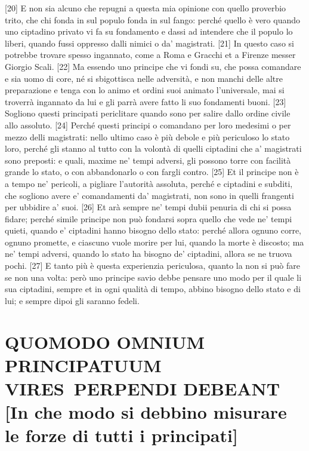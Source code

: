 {[}20{]}
E non sia alcuno che repugni a questa mia opinione con quello proverbio
trito, che chi fonda in sul populo fonda in sul fango: perché quello è
vero quando uno ciptadino privato vi fa su fondamento e dassi ad
intendere che il populo lo liberi, quando fussi oppresso dalli nimici o
da' magistrati. {[}21{]} In questo caso si potrebbe trovare spesso
ingannato, come a Roma e Gracchi et a Firenze messer Giorgio Scali.
{[}22{]} Ma essendo uno principe che vi fondi su, che possa comandare e
sia uomo di core, né si sbigottisca nelle adversità, e non manchi delle
altre preparazione e tenga con lo animo et ordini suoi animato
l'universale, mai si troverrà ingannato da lui e gli parrà avere fatto
li suo fondamenti buoni. {[}23{]} Sogliono questi principati periclitare
quando sono per salire dallo ordine civile allo assoluto. {[}24{]}
Perché questi principi o comandano per loro medesimi o per mezzo delli
magistrati: nello ultimo caso è più debole e più periculoso lo stato
loro, perché gli stanno al tutto con la volontà di quelli ciptadini che
a' magistrati sono preposti: e quali, maxime ne' tempi adversi, gli
possono torre con facilità grande lo stato, o con abbandonarlo o con
fargli contro. {[}25{]} Et il principe non è a tempo ne' pericoli, a
pigliare l'autorità assoluta, perché e ciptadini e subditi, che sogliono
avere e' comandamenti da' magistrati, non sono in quelli frangenti per
ubbidire a' suoi. {[}26{]} Et arà sempre ne' tempi dubii penuria di chi
si possa fidare; perché simile principe non può fondarsi sopra quello
che vede ne' tempi quieti, quando e' ciptadini hanno bisogno dello
stato: perché allora ognuno corre, ognuno promette, e ciascuno vuole
morire per lui, quando la morte è discosto; ma ne' tempi adversi, quando
lo stato ha bisogno de' ciptadini, allora se ne truova pochi. {[}27{]} E
tanto più è questa experienzia periculosa, quanto la non si può fare se
non una volta: però uno principe savio debbe pensare uno modo per il
quale li sua ciptadini, sempre et in ogni qualità di tempo, abbino
bisogno dello stato e di lui; e sempre dipoi gli saranno fedeli.

\quebra\section{QUOMODO OMNIUM PRINCIPATUUM VIRES~PERPENDI DEBEANT\break
{[}In che modo si debbino misurare le forze di tutti i principati{]}}

